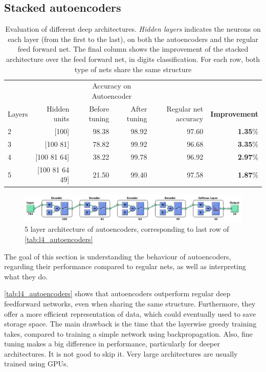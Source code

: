 \documentclass[a4paper, 10pt]{article}
\begin{document}
  \subsection{Stacked autoencoders}
  \begin{table}[h]
    \centering
    \begin{tabular}{@{}lrrrrr@{}}
      \toprule
      && \multicolumn {2}{c}{Accuracy on Autoencoder} \\
      \cmidrule{3-4} 
      Layers & Hidden units & Before tuning & After tuning & 
      Regular net accuracy & \textbf{Improvement} \\
      \midrule
      2   & [100]           &  98.38   &  98.92  &   97.60  &  \textbf{1.35}\% \\
      3   & [100 81]        &  78.82   &  99.92  &   96.68  &  \textbf{3.35}\% \\
      4   & [100 81 64]     &  38.22   &  99.78  &   96.92  &  \textbf{2.97}\% \\
      5   & [100 81 64 49]  &  21.50   &  99.40  &   97.58  &  \textbf{1.87}\% \\
      \bottomrule
    \end{tabular} 
    \caption{Evaluation of different deep architectures. \emph{Hidden layers} 
    indicates the neurons on each layer (from the first to the last), on both
    the autoencoders and the regular feed forward net. The final column shows
    the improvement of the stacked architecture over the feed forward net,
    in digits classification. For each row, both type of nets share the same
    structure}
    \label{tab:l4_autoencoders}
  \end{table}
  \begin{figure}[htpb]
    \centering
    \includegraphics[width=\linewidth]{lab4/deep_architecture.png}
    \caption{5 layer architecture of autoencoders, corresponding to last row
    of \autoref{tab:l4_autoencoders}}
    \label{fig:l4_architecture}
  \end{figure}

  The goal of this section is understanding the behaviour of autoencoders, 
  regarding their performance compared to regular nets, as well as interpreting
  what they do. 

  \autoref{tab:l4_autoencoders} shows that autoencoders outperform regular deep
  feedforward networks, even when sharing the same structure. Furthermore, 
  they offer a more efficient representation of data, which could eventually
  used to save storage space. The main drawback is the time that
  the layerwise greedy training takes, compared to training a simple 
  network using backpropagation. Also, fine tuning makes a big difference in 
  performance, particularly for deeper architectures. It is not good to skip it.
  Very large architectures are usually trained using GPUs.
\end{document}
